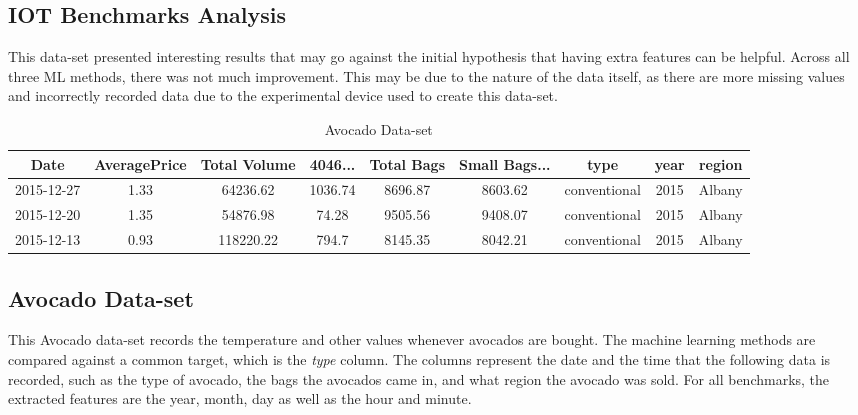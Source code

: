 \documentclass{article}
\begin{document}
\subsection{IOT Benchmarks Analysis}
This data-set presented interesting results that may go against the initial hypothesis that having extra features can be helpful. Across all three ML methods, there was not much improvement. This may be due to the nature of the data itself, as there are more missing values and incorrectly recorded data due to the experimental device used to create this data-set. 

\def\arraystretch{1.5}
\begin{table}[ht]
\caption{Avocado Data-set}
\begin{tabular}{|c|c|c|c|c|c|c|c|c|}
\hline
Date & AveragePrice & Total Volume & 4046... & Total Bags & Small Bags... & type & year & region \\
\hline
2015-12-27 & 1.33 & 64236.62 & 1036.74 & 8696.87 & 8603.62 & conventional & 2015 & Albany \\
\hline
2015-12-20 & 1.35 & 54876.98 & 74.28 & 9505.56 & 9408.07 & conventional & 2015 & Albany \\
\hline
2015-12-13 & 0.93 & 118220.22 & 794.7 & 8145.35 & 8042.21 & conventional & 2015 & Albany \\
\hline
\end{tabular}
\end{table}

\subsection{Avocado Data-set}
This Avocado data-set records the temperature and other values whenever avocados are bought. The machine learning methods are compared against a common target, which is the \textit{type} column. The columns represent the date and the time that the following data is recorded, such as the type of avocado, the bags the avocados came in, and what region the avocado was sold. For all benchmarks, the extracted features are the year, month, day as well as the hour and minute. 
\end{document}
